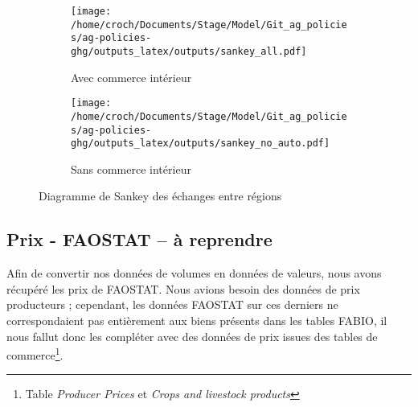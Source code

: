 \begin{figure}[hbt!]
    \centering
    \begin{subfigure}[b]{0.495\textwidth}
        \centering
        \texttt{[image: /home/croch/Documents/Stage/Model/Git\_ag\_policies/ag-policies-ghg/outputs\_latex/outputs/sankey\_all.pdf]}
        \caption{Avec commerce intérieur}
        \label{fig:sankey1}
    \end{subfigure}
    \begin{subfigure}[b]{0.495\textwidth}
        \centering
        \texttt{[image: /home/croch/Documents/Stage/Model/Git\_ag\_policies/ag-policies-ghg/outputs\_latex/outputs/sankey\_no\_auto.pdf]}
        \caption{Sans commerce intérieur}
        \label{fig:sankey2}
    \end{subfigure}
    \caption{Diagramme de Sankey des échanges entre régions}
    \label{fig:sankey}
\end{figure}

\subsection{Prix - FAOSTAT \textbf{-- à reprendre}}\label{subsec:prix}

Afin de convertir nos données de volumes en données de valeurs, nous avons récupéré les prix de FAOSTAT. Nous avions besoin des données de prix producteurs ; cependant, les données FAOSTAT sur ces derniers ne correspondaient pas entièrement aux biens présents dans les tables FABIO, il nous fallut donc les compléter avec des données de prix issues des tables de commerce\footnote{Table \textit{Producer Prices} et \textit{Crops and livestock products}}.

